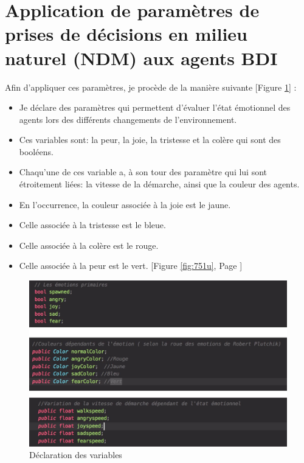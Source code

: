 \section{Application de paramètres de prises de décisions en milieu naturel (NDM) aux agents BDI}

Afin d’appliquer ces paramètres, je procède de la manière suivante [Figure \ref{fig:75}] : 

\begin{itemize}
\item Je déclare des paramètres qui permettent d’évaluer l’état émotionnel des agents lors des différents changements de l’environnement.
\item Ces variables sont: la peur, la joie, la tristesse et la colère qui sont des booléens.
\item Chaqu’une de ces variable a, à son tour des paramètre qui lui sont étroitement liées: la vitesse de la démarche, ainsi que la couleur des agents.
\item En l'occurrence, la couleur associée à la joie est le jaune.
\item Celle associée à la tristesse est le bleue.
\item Celle associée à la colère est le rouge.
\item Celle associée à la peur est le vert. [Figure \ref{fig:751u}, Page \pageref{fig:751u}]
\end{itemize} 

\begin{figure}[th]
\centering
\includegraphics{Figures/75unity.JPG}
\decoRule
\caption[Déclaration des variables]{Déclaration des variables}
\label{fig:75}
\end{figure}



